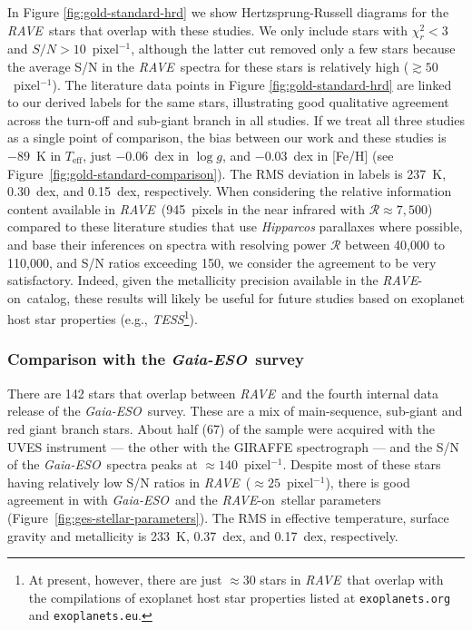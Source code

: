 \documentclass[preprint]{aastex}
\newcommand{\acronym}[1]{{\small{#1}}}
\newcommand{\project}[1]{\textsl{#1}}
\newcommand{\rave}{\project{\acronym{RAVE}}}
\newcommand{\ges}{\project{Gaia-ESO}}
\newcommand{\raveon}{\rave-on}
\newcommand{\teff}{T_{\mathrm{eff}}}
\newcommand{\logg}{\log g}
\begin{document}
In Figure \ref{fig:gold-standard-hrd} we show Hertzsprung-Russell diagrams 
for the \rave\ stars that overlap with these studies.  We only include stars 
with $\chi_r^2 < 3$ and $S/N > 10$~pixel$^{-1}$, although the latter cut 
removed only a few stars because the average S/N in the \rave\ spectra for
these stars is relatively high ($\gtrsim{}50$~pixel$^{-1}$).  The literature 
data points in Figure \ref{fig:gold-standard-hrd} are linked to our derived
labels for the same stars, illustrating good qualitative agreement across 
the turn-off and sub-giant branch in all studies.  If we treat all three 
studies as a single point of comparison, the bias between our work and these 
studies is $-89$~K in $\teff$, just $-0.06$~dex in $\logg$, and $-0.03$~dex 
in [Fe/H] (see Figure~\ref{fig:gold-standard-comparison}).  The RMS deviation
in labels is 237~K, 0.30~dex, and 0.15~dex, respectively.  When considering 
the relative information content available in \rave\ (945~pixels in the near 
infrared with $\mathcal{R} \approx 7{,}500$) compared to these literature 
studies that use \project{Hipparcos} parallaxes where possible, and base 
their inferences on spectra with resolving power $\mathcal{R}$ between 
40,000 to 110,000, and S/N ratios exceeding 150, we consider the agreement 
to be very satisfactory.  Indeed, given the metallicity precision available
in the \raveon\ catalog, these results will likely be useful for future 
studies based on exoplanet host star properties (e.g., 
\project{TESS}\footnote{At present, however, there are just $\approx$30 
stars in \rave\ that overlap with the compilations of exoplanet host star 
properties listed at \texttt{exoplanets.org} and \texttt{exoplanets.eu}.}).


\subsubsection{Comparison with the \ges\ survey}
\label{sec:validation-ges}


There are 142 stars that overlap between \rave\ and the fourth internal
data release of the \ges\ survey. These are a mix of main-sequence, 
sub-giant and red giant branch stars.  About half (67) of the sample 
were acquired with the \acronym{UVES} instrument --- the other with the 
\acronym{GIRAFFE} spectrograph --- and the S/N of the \ges\ spectra peaks 
at $\approx140$~pixel$^{-1}$.  Despite most of these stars having relatively 
low S/N ratios in \rave\ ($\approx 25$~pixel$^{-1}$), there is good agreement
in with \ges\ and the \raveon\ stellar parameters (Figure~\ref{fig:ges-stellar-parameters}).  
The RMS in effective temperature, surface gravity and metallicity is 233~K, 
0.37~dex, and 0.17~dex, respectively.  
\end{document}
